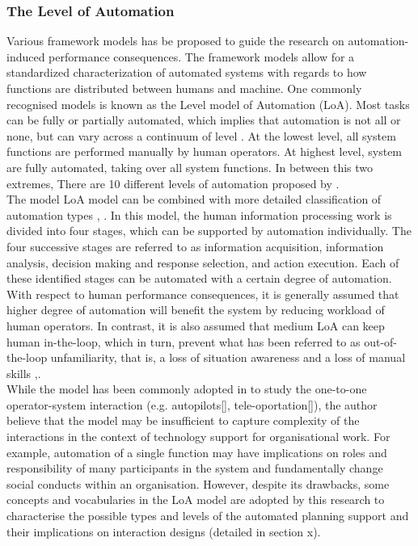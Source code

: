 \subsubsection{The Level of Automation}
Various framework models has be proposed to guide the research on automation-induced performance consequences. The framework models allow for a standardized characterization of automated systems with regards to how functions are distributed between humans and machine. One commonly recognised models is known as the Level model of Automation (LoA). Most tasks can be fully or partially automated, which implies that automation is not all or none, but can vary across a continuum of level \cite{Wickens2010}. At the lowest level, all system functions are performed manually by human operators.  At highest level, system are fully automated, taking over all system functions. In between this two extremes, There are 10 different levels of automation proposed by \cite{Wickens2010}. \\

The model LoA model can be combined with more detailed classification of automation types \cite{Parasuraman2000}, \cite{Manzey2012}. In this model,  the human information processing work is divided into four stages, which can be supported by automation individually. The four successive stages are referred to as information acquisition, information analysis, decision making and response selection, and action execution. Each of these identified stages can be automated with a certain degree of automation. With respect to human performance consequences, it is generally assumed that higher degree of automation will benefit the system by reducing workload of human operators. In contrast, it is also assumed that medium LoA can keep human in-the-loop, which in turn, prevent what has been referred to as out-of-the-loop unfamiliarity, that is, a loss of situation awareness and a loss of manual skills \cite{Kaber1997},\cite{Parasuraman2010}.\\

While the model has been commonly adopted in to study the one-to-one operator-system interaction (e.g. autopilots[], tele-oportation[]), the author believe that the model may be insufficient to capture complexity of the interactions in the context of technology support for organisational work. For example, automation of a single function may have implications on roles and responsibility of many participants in the system and fundamentally change social conducts within an organisation. However, despite its drawbacks, some concepts and vocabularies in the LoA model are adopted by this research to characterise the possible types and levels of the automated planning support and their implications on interaction designs (detailed in section x).\\

